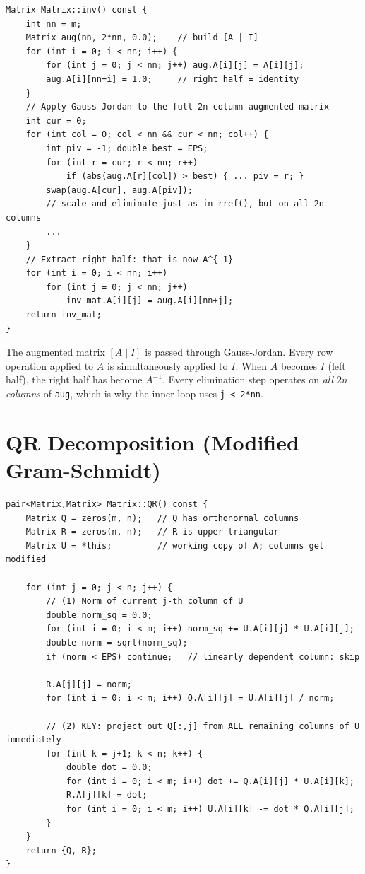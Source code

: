 \documentclass[12pt, a4paper]{article}
\newcommand{\code}[1]{\texttt{\small#1}}
\begin{document}
\begin{lstlisting}
Matrix Matrix::inv() const {
    int nn = m;
    Matrix aug(nn, 2*nn, 0.0);    // build [A | I]
    for (int i = 0; i < nn; i++) {
        for (int j = 0; j < nn; j++) aug.A[i][j] = A[i][j];
        aug.A[i][nn+i] = 1.0;     // right half = identity
    }
    // Apply Gauss-Jordan to the full 2n-column augmented matrix
    int cur = 0;
    for (int col = 0; col < nn && cur < nn; col++) {
        int piv = -1; double best = EPS;
        for (int r = cur; r < nn; r++)
            if (abs(aug.A[r][col]) > best) { ... piv = r; }
        swap(aug.A[cur], aug.A[piv]);
        // scale and eliminate just as in rref(), but on all 2n columns
        ...
    }
    // Extract right half: that is now A^{-1}
    for (int i = 0; i < nn; i++)
        for (int j = 0; j < nn; j++)
            inv_mat.A[i][j] = aug.A[i][nn+j];
    return inv_mat;
}
\end{lstlisting}

The augmented matrix $[A \mid I]$ is passed through Gauss-Jordan.  Every row
operation applied to $A$ is simultaneously applied to $I$.  When $A$ becomes
$I$ (left half), the right half has become $A^{-1}$.  Every elimination step
operates on \emph{all $2n$ columns} of \code{aug}, which is why the inner loop
uses \code{j < 2*nn}.

\section{QR Decomposition (Modified Gram-Schmidt)}

\begin{lstlisting}
pair<Matrix,Matrix> Matrix::QR() const {
    Matrix Q = zeros(m, n);   // Q has orthonormal columns
    Matrix R = zeros(n, n);   // R is upper triangular
    Matrix U = *this;         // working copy of A; columns get modified

    for (int j = 0; j < n; j++) {
        // (1) Norm of current j-th column of U
        double norm_sq = 0.0;
        for (int i = 0; i < m; i++) norm_sq += U.A[i][j] * U.A[i][j];
        double norm = sqrt(norm_sq);
        if (norm < EPS) continue;   // linearly dependent column: skip

        R.A[j][j] = norm;
        for (int i = 0; i < m; i++) Q.A[i][j] = U.A[i][j] / norm;

        // (2) KEY: project out Q[:,j] from ALL remaining columns of U immediately
        for (int k = j+1; k < n; k++) {
            double dot = 0.0;
            for (int i = 0; i < m; i++) dot += Q.A[i][j] * U.A[i][k];
            R.A[j][k] = dot;
            for (int i = 0; i < m; i++) U.A[i][k] -= dot * Q.A[i][j];
        }
    }
    return {Q, R};
}
\end{lstlisting}
\end{document}
